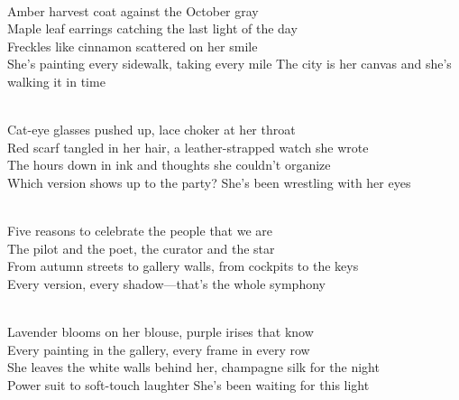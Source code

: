 
\begin{notes}
\end{notes}

\begin{lyrics}
\\
Amber harvest coat against the October gray\\
Maple leaf earrings catching the last light of the day\\
Freckles like cinnamon scattered on her smile\\
She's painting every sidewalk, taking every mile
 The city is her canvas and she's walking it in time

\\
Cat-eye glasses pushed up, lace choker at her throat\\
Red scarf tangled in her hair, a leather-strapped watch she wrote\\
The hours down in ink and thoughts she couldn't organize\\
Which version shows up to the party?
 She's been wrestling with her eyes

\\
Five reasons to celebrate the people that we are\\
The pilot and the poet, the curator and the star\\
From autumn streets to gallery walls, from cockpits to the keys\\
Every version, every shadow—that's the whole symphony

\\
Lavender blooms on her blouse, purple irises that know\\
Every painting in the gallery, every frame in every row\\
She leaves the white walls behind her, champagne silk for the night\\
Power suit to soft-touch laughter
 She's been waiting for this light


\end{lyrics}
